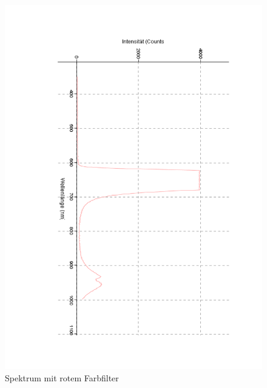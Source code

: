\documentclass[12pt,a4paper]{article}
\begin{document}
\begin{figure}[H]
	\centering
	\includegraphics[scale=0.5,angle = 90,trim = 20mm 20mm 20mm 20mm]{./data/Spektro/Farbfilter_Absorbtion_Rot_DO4.pdf}
	\caption{Spektrum mit rotem Farbfilter}
	\label{fig:FilterRot}
\end{figure}
\end{document}
